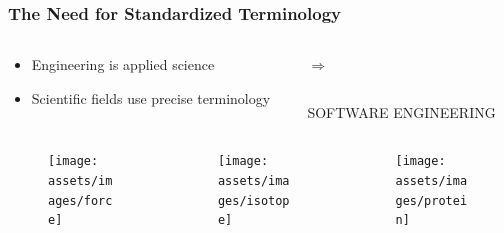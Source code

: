 \documentclass{beamer}
\begin{document}
\begin{frame}
    \frametitle{The Need for Standardized Terminology}
    \begin{columns}[T]
        \begin{column}{.6\textwidth}
            \begin{itemize}
                \item Engineering is applied science
                \item Scientific fields use precise terminology
            \end{itemize}
        \end{column}
        \begin{column}{.4\textwidth}
            \begin{column}{.3\textwidth}
                \begin{center}
                    \vspace*{\fill}
                    \vspace{2mm}
                    \huge \textbf{$\Rightarrow$}
                    \vspace*{\fill}
                \end{center}
            \end{column}
            \begin{column}{.7\textwidth}
                \vspace{-1mm}
                \begin{block}{}{
                        \begin{center}
                            SOFTWARE ENGINEERING
                        \end{center}
                    }
                \end{block}
            \end{column}
        \end{column}
    \end{columns}
    \pause
    \vspace{5mm}
    \begin{columns}[b]
        \begin{column}{.3\textwidth}
            \begin{figure}
                \texttt{[image: assets/images/force]}
                \caption{\tiny \cite{force}}
            \end{figure}
        \end{column}
        \begin{column}{.3\textwidth}
            \begin{figure}
                \texttt{[image: assets/images/isotope]}
                \caption{\tiny \cite{isotope}}
            \end{figure}
        \end{column}
        \begin{column}{.3\textwidth}
            \begin{figure}
                \texttt{[image: assets/images/protein]}
                \caption{\tiny \cite{protein}}
            \end{figure}
        \end{column}
    \end{columns}
\end{frame}
\end{document}
